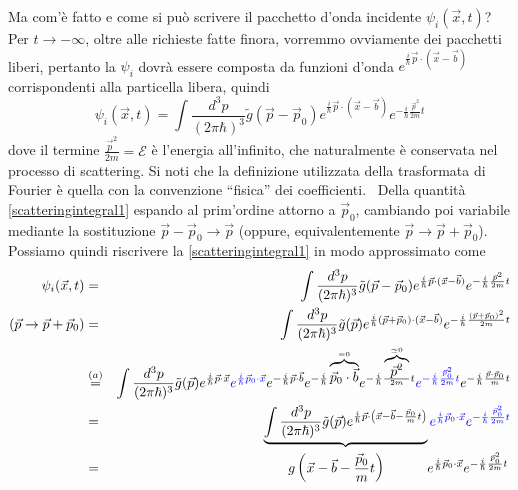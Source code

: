 \documentclass[../../FisicaTeorica.tex]{subfiles}
\begin{document}
Ma com'{\`e} fatto e come si pu{\`o} scrivere il pacchetto d'onda incidente $\psi_i
(\vec{x}, t)$? Per $t \to - \infty$, oltre alle richieste fatte finora,
vorremmo ovviamente dei pacchetti liberi, pertanto la $\psi_i$ dovr{\`a}
essere composta da funzioni d'onda $e^{\frac{i}{\hbar}  \vec{p} \cdot (\vec{x}
- \vec{b})}$ corrispondenti alla particella libera, quindi
\begin{equation}
  \label{scatteringintegral1} \psi_i (\vec{x}, t) = \int \frac{d^3 p}{(2 \pi
  \hbar)^3}  \tilde{g} (\vec{p} - \vec{p}_0) e^{\frac{i}{\hbar}  \vec{p} \cdot
  (\vec{x} - \vec{b})} e^{- \frac{i}{\hbar}  \frac{\vec{p}^2}{2 m} t}
\end{equation}
dove il termine $\frac{\vec{p}^2}{2 m} = \mathcal{E}$ {\`e} l'energia
all'infinito, che naturalmente {\`e} conservata nel processo di scattering. Si
noti che la definizione utilizzata della trasformata di Fourier {\`e} quella
con la convenzione ``fisica'' dei coefficienti. \ Della quantit{\`a}
{\eqref{scatteringintegral1}} espando al prim'ordine attorno a $\vec{p}_0$,
cambiando poi variabile mediante la sostituzione $\vec{p} - \vec{p}_0
\rightarrow \vec{p}$ (oppure, equivalentemente $\vec{p} \rightarrow
\vec{p} + \vec{p}_0$). Possiamo quindi riscrivere la
{\eqref{scatteringintegral1}} in modo approssimato come
\begin{eqnarray*}
  \psi_i (\vec{x}, t) & = & \int \frac{d^3 p}{(2 \pi \hbar)^3}  \tilde{g}
  (\vec{p} - \vec{p}_0) e^{\frac{i}{\hbar}  \vec{p} \cdot (\vec{x} - \vec{b})}
  e^{- \frac{i}{\hbar}  \frac{\vec{p}^2}{2 m} t}\\
  (\vec{p} \rightarrow \vec{p} + \vec{p}_0) & =^{} & \int \frac{d^3 p}{(2 \pi
  \hbar)^3}  \tilde{g} (\vec{p}) e^{\frac{i}{\hbar} (\vec{p} + \vec{p}_0)
  \cdot (\vec{x} - \vec{b})} e^{- \frac{i}{\hbar}  \frac{(\vec{p} +
  \vec{p}_0)^2}{2 m} t} \\
  & \overset{(a)}{=} & \int \frac{d^3 p}{(2 \pi \hbar)^3}  \tilde{g} (\vec{p}) e^{
  \frac{i}{\hbar} \vec{p} \cdot \vec{x}}  \tmcolor{blue}{e^{ \frac{i}{\hbar}
  \vec{p}_0 \cdot \vec{x}}} e^{- \frac{i}{\hbar} \vec{p} \cdot \vec{b}} e^{-
  \frac{i}{\hbar} \overbrace{\vec{p}_0 \cdot \vec{b}}^{= 0}} e^{-
  \frac{i}{\hbar}  \frac{\overbrace{\vec{p}^2}^{\simeq 0}}{2 m} t}
  \tmcolor{blue}{e^{- \frac{i}{\hbar}  \frac{\vec{p}_0^2}{2 m} t}} e^{-
  \frac{i}{\hbar}  \frac{\vec{p} \cdot \vec{p}_0}{m} t}\\
  & = & \underbrace{\int  \frac{d^3 p}{(2 \pi \hbar)^3}  \tilde{g} (\vec{p})
  e^{ \frac{i}{\hbar} \vec{p} \cdot \left( \vec{x} - \vec{b} -
  \frac{\vec{p}_0}{m} t \right)}}  \tmcolor{blue}{e^{ \frac{i}{\hbar}
  \vec{p}_0 \cdot \vec{x}} e^{- \frac{i}{\hbar}  \frac{\vec{p}_0^2}{2 m} t}}\\
  & = & \hspace{0.17em} \hspace{2.17em} g \left( \vec{x} - \vec{b} -
  \frac{\vec{p}_0}{m} t \right)  \hspace{3em} e^{\frac{i}{\hbar}  \vec{p}_0
  \cdot \vec{x}} e^{- \frac{i}{\hbar}  \frac{\vec{p}_0^2}{2 m} t}
  \hspace{0.17em}
\end{eqnarray*}
\end{document}
